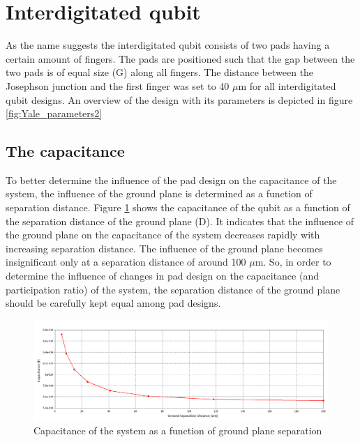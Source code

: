 \clearpage
\section{Interdigitated qubit}
As the name suggests the interdigitated qubit consists of two pads having a certain amount of fingers. The pads are positioned such that the gap between the two pads is of equal size (G) along all fingers. The distance between the Josephson junction and the first finger was set to 40 \(\mu\)m for all interdigitated qubit designs. An overview of the design with its parameters is depicted in figure \ref{fig:Yale_parameters2}




\subsection{The capacitance}
To better determine the influence of the pad design on the capacitance of the system, the influence of the ground plane is determined as a function of separation distance. Figure \ref{fig:capacitance_vs_slotsize} shows the capacitance of the qubit as a function of the separation distance of the ground plane (D). It indicates that the influence of the ground plane on the capacitance of the system decreases rapidly with increasing separation distance. The influence of the ground plane becomes insignificant only at a separation distance of around 100 \(\mu\)m. So, in order to determine the influence of changes in pad design on the capacitance (and participation ratio) of the system, the separation distance of the ground plane should be carefully kept equal among pad designs.  

\begin{figure}
	\centering
	\includegraphics[width = \textwidth]{Figures/capacitance_vs_slotsize_edit}
	\caption{Capacitance of the system as a function of ground plane separation}
	\label{fig:capacitance_vs_slotsize}
\end{figure}

